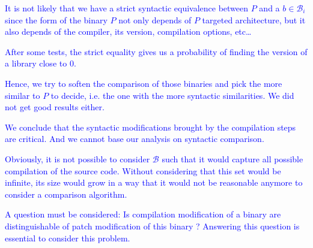 \documentclass{article}
\newcommand{\ludo}[1]{\textcolor{blue}{#1}}
\begin{document}
    \ludo{It is not likely that we have a strict syntactic equivalence between
    $P$ and a $b \in \mathcal{B}_i$ since the form of the binary $P$ not only
    depends of $P$ targeted architecture, but it also depends of the compiler,
    its version, compilation options, etc\dots}

    \ludo{After some tests, the strict equality gives us a probability of
    finding the version of a library close to $0$.}

    \ludo{Hence, we try to soften the comparison of those binaries and pick
    the more similar to $P$ to decide, i.e. the one with the more syntactic
    similarities. We did not get good results either.}

    \ludo{We conclude that the syntactic modifications brought by the compilation steps
    are critical. And we cannot base our analysis on syntactic comparison.}


%
    
    \ludo{Obviously, it is not possible to consider $\mathcal{B}$ such that it
    would capture all possible compilation of the source code. Without
    considering that this set would be infinite, its size would grow in a way
    that it would not be reasonable anymore to consider a comparison algorithm.}

    \ludo{A question must be considered: Is compilation modification of a
    binary are distinguishable of patch modification of this binary ?
    Answering this question is essential to consider this problem.}
\end{document}
